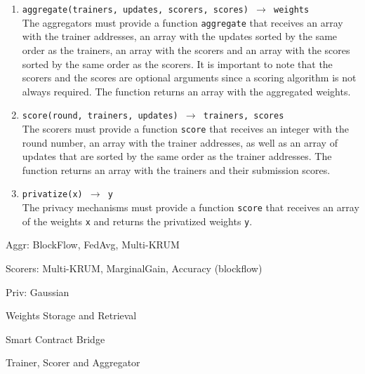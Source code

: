\begin{enumerate}
    \item \texttt{aggregate(trainers, updates, scorers, scores) $\rightarrow$ weights}\\
    The aggregators must provide a function \texttt{aggregate} that receives an array with the trainer addresses, an array with the updates sorted by the same order as the trainers, an array with the scorers and an array with the scores sorted by the same order as the scorers. It is important to note that the scorers and the scores are optional arguments since a scoring algorithm is not always required. The function returns an array with the aggregated weights.
    
    \item \texttt{score(round, trainers, updates) $\rightarrow$ trainers, scores}\\
    The scorers must provide a function \texttt{score} that receives an integer with the round number, an array with the trainer addresses, as well as an array of updates that are sorted by the same order as the trainer addresses. The function returns an array with the trainers and their submission scores.
    
    \item \texttt{privatize(x) $\rightarrow$ y}\\
    The privacy mechanisms must provide a function \texttt{score} that receives an array of the weights \texttt{x} and returns the privatized weights \texttt{y}.
\end{enumerate}

Aggr: BlockFlow, FedAvg, Multi-KRUM

Scorers: Multi-KRUM, MarginalGain, Accuracy (blockflow)

Priv: Gaussian


Weights Storage and Retrieval

Smart Contract Bridge

Trainer, Scorer and Aggregator



